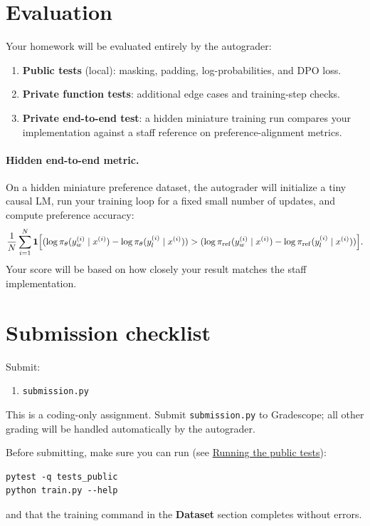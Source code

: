 \documentclass[11pt]{article}
\begin{document}
\section*{Evaluation}

Your homework will be evaluated entirely by the autograder:

\begin{enumerate}[itemsep=0.5em]
    \item \textbf{Public tests} (local): masking, padding, log-probabilities, and DPO loss.
    \item \textbf{Private function tests}: additional edge cases and training-step checks.
    \item \textbf{Private end-to-end test}: a hidden miniature training run compares your implementation against a staff reference on preference-alignment metrics.
\end{enumerate}

\paragraph{Hidden end-to-end metric.}
On a hidden miniature preference dataset, the autograder will initialize a tiny causal LM, run your training loop for a fixed small number of updates, and compute preference accuracy:
\[
\frac{1}{N}
\sum_{i=1}^{N}
\mathbf{1}
\Bigl[
(\log \pi_\theta(y_w^{(i)} \mid x^{(i)}) - \log \pi_\theta(y_l^{(i)} \mid x^{(i)}))
>
(\log \pi_{\mathrm{ref}}(y_w^{(i)} \mid x^{(i)}) - \log \pi_{\mathrm{ref}}(y_l^{(i)} \mid x^{(i)}))
\Bigr].
\]
Your score will be based on how closely your result matches the staff implementation.

\section*{Submission checklist}

Submit:
\begin{enumerate}[itemsep=0.25em]
    \item \texttt{submission.py}
\end{enumerate}

This is a coding-only assignment. Submit \texttt{submission.py} to Gradescope; all other grading will be handled automatically by the autograder.

Before submitting, make sure you can run (see \hyperref[sec:running-tests]{Running the public tests}):
\begin{lstlisting}
pytest -q tests_public
python train.py --help
\end{lstlisting}
and that the training command in the \textbf{Dataset} section completes without errors.
\end{document}
